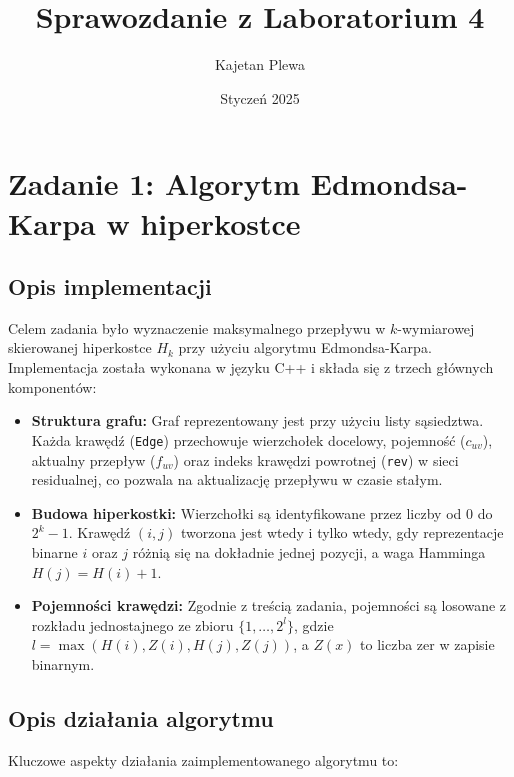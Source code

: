 \documentclass[11pt, a4paper]{article}
\title{Sprawozdanie z Laboratorium 4}
\author{Kajetan Plewa}
\date{Styczeń 2025}
\begin{document}
	\maketitle
	\thispagestyle{empty}
	\clearpage
	\section{Zadanie 1: Algorytm Edmondsa-Karpa w hiperkostce}
	
	\subsection{Opis implementacji}
	Celem zadania było wyznaczenie maksymalnego przepływu w $k$-wymiarowej skierowanej hiperkostce $H_k$ przy użyciu algorytmu Edmondsa-Karpa. Implementacja została wykonana w języku C++ i składa się z trzech głównych komponentów:
	
	\begin{itemize}
		\item \textbf{Struktura grafu:} Graf reprezentowany jest przy użyciu listy sąsiedztwa. Każda krawędź (\texttt{Edge}) przechowuje wierzchołek docelowy, pojemność ($c_{uv}$), aktualny przepływ ($f_{uv}$) oraz indeks krawędzi powrotnej (\texttt{rev}) w sieci residualnej, co pozwala na aktualizację przepływu w czasie stałym.
		\item \textbf{Budowa hiperkostki:} Wierzchołki są identyfikowane przez liczby od $0$ do $2^k-1$. Krawędź $(i, j)$ tworzona jest wtedy i tylko wtedy, gdy reprezentacje binarne $i$ oraz $j$ różnią się na dokładnie jednej pozycji, a waga Hamminga $H(j) = H(i) + 1$.
		\item \textbf{Pojemności krawędzi:} Zgodnie z treścią zadania, pojemności są losowane z rozkładu jednostajnego ze zbioru $\{1, \dots, 2^l\}$, gdzie $l = \max(H(i), Z(i), H(j), Z(j))$, a $Z(x)$ to liczba zer w zapisie binarnym.
	\end{itemize}
	
\subsection{Opis działania algorytmu}
 Kluczowe aspekty działania zaimplementowanego algorytmu to:
\end{document}
